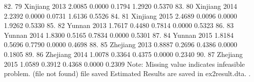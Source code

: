  82. {\VBAR}  79       Xinjiang   2013   2.0085   0.0000   0.1794   1.2920   0.5370 {\VBAR}
 83. {\VBAR}  80       Xinjiang   2014   2.2392   0.0000   0.0731   1.6136   0.5526 {\VBAR}
 84. {\VBAR}  81       Xinjiang   2015   2.4689   0.0096   0.0000   1.9262   0.5330 {\VBAR}
 85. {\VBAR}  82         Yunnan   2013   1.7617   0.4480   0.7814   0.0000   0.5323 {\VBAR}
 86. {\VBAR}  83         Yunnan   2014   1.8300   0.5165   0.7834   0.0000   0.5301 {\VBAR}
 87. {\VBAR}  84         Yunnan   2015   1.8184   0.5696   0.7790   0.0000   0.4698 {\VBAR}
 88. {\VBAR}  85       Zhejiang   2013   0.8887   0.2696   0.4386   0.0000   0.1805 {\VBAR}
 89. {\VBAR}  86       Zhejiang   2014   1.0078   0.3364   0.4375   0.0000   0.2340 {\VBAR}
 90. {\VBAR}  87       Zhejiang   2015   1.0589   0.3912   0.4368   0.0000   0.2309 {\VBAR}
     {\BLC}
Note: Missing value indicates infeasible problem.
(file{} not found)
file{} saved
{\smallskip}
Estimated Results are saved in ex2result.dta.
{\smallskip}
. 
